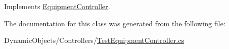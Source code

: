 Implements \mbox{\hyperlink{class_equipment_controller_ad15c45b6812eaefdaf26636ed8c45ab4}{Equipment\+Controller}}.



The documentation for this class was generated from the following file\+:\begin{DoxyCompactItemize}
\item 
Dynamic\+Objects/\+Controllers/\mbox{\hyperlink{_test_equipment_controller_8cs}{Test\+Equipment\+Controller.\+cs}}\end{DoxyCompactItemize}
